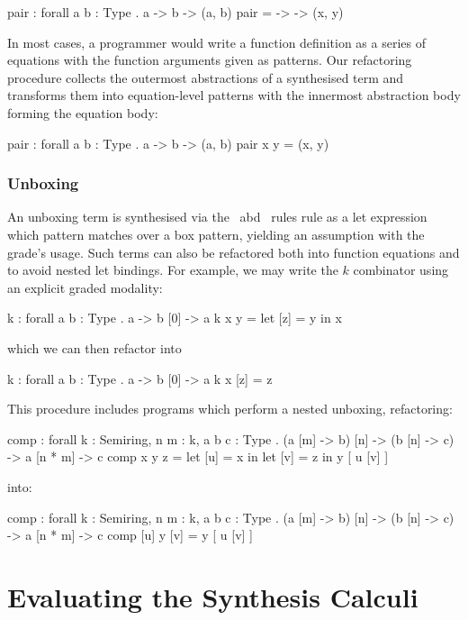 \begin{granule}
pair : forall { a b : Type } . a -> b -> (a, b)
pair = \x -> \y -> (x, y)
\end{granule}

In most cases, a programmer would write a function definition as a series of
equations with the function arguments given as patterns. Our refactoring
procedure collects the outermost abstractions of a synthesised term and
transforms them into equation-level patterns with the innermost abstraction
body forming the equation body:

\begin{granule}
pair : forall { a b : Type } . a -> b -> (a, b)
pair x y = (x, y)
\end{granule}

\subsubsection{Unboxing}
An unboxing term is synthesised via the \subUnboxName\ abd \addUnboxName\ rules
rule as a let expression which pattern matches over a box pattern, yielding an
assumption with the grade's usage. Such terms can also be refactored both into
function equations and to avoid nested let bindings. For example, we may write
the $k$ combinator using an explicit graded modality:

\begin{granule}
k : forall { a b : Type } . a -> b [0] -> a
k x y = let [z] = y in x
\end{granule}
which we can then refactor into
\begin{granule}
k : forall { a b : Type } . a -> b [0] -> a
k x [z] = z
\end{granule}
This procedure includes programs which perform a nested unboxing, refactoring:
\begin{granule}
comp : forall {k : Semiring, n m : k, a b c : Type} 
     . (a [m] -> b) [n] 
     -> (b [n] -> c) 
     -> a [n * m] 
     -> c
comp x y z = let [u] = x in let [v] = z in y [ u [v] ]
\end{granule}
into:
\begin{granule}
comp : forall {k : Semiring, n m : k, a b c : Type}
     . (a [m] -> b) [n] 
     -> (b [n] -> c) 
     -> a [n * m] 
     -> c
comp [u] y [v] = y [ u [v] ]
\end{granule}



\section{Evaluating the Synthesis Calculi}
\label{sec:linear-base-evaluation}

